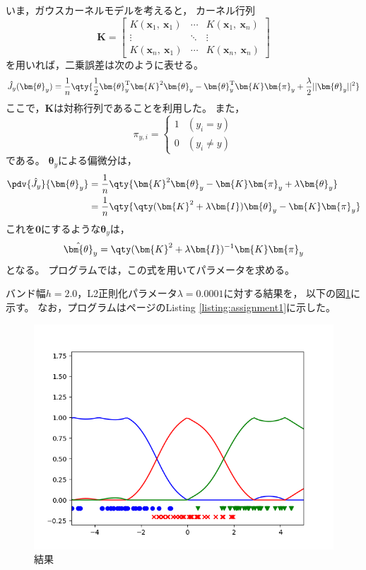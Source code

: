\documentclass[class=jsarticle, crop=false, dvipdfmx, fleqn]{standalone}
\begin{document}
いま，ガウスカーネルモデルを考えると，
カーネル行列
\begin{equation}
    \bm{K} =
        \begin{bmatrix}
            K(\bm{x}_1,\ \bm{x}_1) & \cdots & K(\bm{x}_1,\ \bm{x}_n) \\
            \vdots & \ddots & \vdots \\
            K(\bm{x}_n,\ \bm{x}_1) & \cdots & K(\bm{x}_n,\ \bm{x}_n)
        \end{bmatrix}
\end{equation}
を用いれば，二乗誤差は次のように表せる。
\begin{equation}
    \hat{J}_y (\bm{\theta}_y)
        = \frac{1}{n} \qty{
            \frac{1}{2} \bm{\theta}_y^\mathrm{T} \bm{K}^2 \bm{\theta}_y - \bm{\theta}_y^\mathrm{T} \bm{K} \bm{\pi}_y + \frac{\lambda}{2} ||\bm{\theta}_y||^2
            }
\end{equation}
ここで，\(\bm{K}\)は対称行列であることを利用した。
また，
\begin{equation}
    \pi_{y, i} =
        \begin{cases}
            1 & (y_i = y) \\
            0 & (y_i \neq y)
        \end{cases}
\end{equation}
である。
\(\bm{\theta}_y\)による偏微分は，
\begin{align}
    \pdv{\hat{J}_y}{\bm{\theta}_y}
        & = \frac{1}{n} \qty{
            \bm{K}^2 \bm{\theta}_y - \bm{K} \bm{\pi}_y + \lambda \bm{\theta}_y
            } \\
        & = \frac{1}{n} \qty{
            \qty(\bm{K}^2 + \lambda \bm{I}) \bm{\theta}_y - \bm{K} \bm{\pi}_y
            }
\end{align}
これを\(\bm{0}\)にするような\(\bm{\theta}_y\)は，
\begin{equation}
    \hat{\bm{\theta}}_y = \qty(\bm{K}^2 + \lambda \bm{I})^{-1} \bm{K} \bm{\pi}_y
\end{equation}
となる。
プログラムでは，この式を用いてパラメータを求める。

バンド幅\(h = 2.0\)，L2正則化パラメータ\(\lambda = 0.0001\)に対する結果を，
以下の図\ref{fig:result}に示す。
なお，プログラムは\pageref{listing:assignment1}ページのListing \ref{listing:assignment1}に示した。

\begin{figure}[H]
    \centering
    \includegraphics[clip, width=12cm]{../figures/assignment1_result}
    \caption{結果}
    \label{fig:result}
\end{figure}
\end{document}

